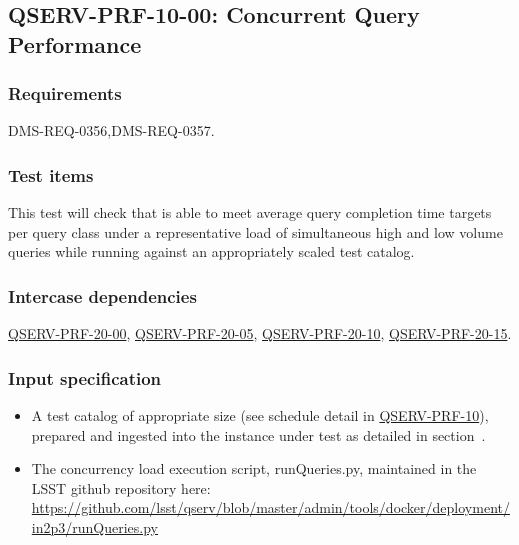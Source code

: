 \subsection{\textsc{QSERV-PRF-10-00}: Concurrent Query Performance}
\label{qserv-prf-10-00}

\subsubsection{Requirements \label{sect:reqs}}

DMS-REQ-0356,DMS-REQ-0357.

\subsubsection{Test items}

This test will check that \product{} is able to meet average query completion time targets per query class
under a representative load of simultaneous high and low volume queries while running against an appropriately
scaled test catalog.

\subsubsection{Intercase dependencies}

\hyperref[qserv-prf-20-00]{\textsc{QSERV-PRF-20-00}},
\hyperref[qserv-prf-20-05]{\textsc{QSERV-PRF-20-05}},
\hyperref[qserv-prf-20-10]{\textsc{QSERV-PRF-20-10}},
\hyperref[qserv-prf-20-15]{\textsc{QSERV-PRF-20-15}}.

\subsubsection{Input specification}

\begin{itemize}

  \item{A test catalog of appropriate size (see schedule detail in \hyperref[qserv-prf-10]{\textsc{
  QSERV-PRF-10}}), prepared and ingested into the \product{} instance under test as detailed in
  section~.}

  \item{The concurrency load execution script, runQueries.py, maintained in the LSST \product{}
  github repository here: \url{https://github.com/lsst/qserv/blob/master/admin/tools/docker/deployment/in2p3/runQueries.py}}

\end{itemize}

